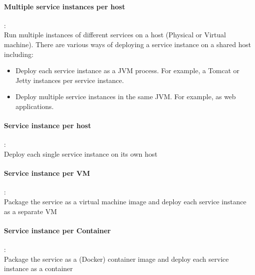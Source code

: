 \paragraph{Multiple service instances per host} :\\
\label{sec:sec01}
Run multiple instances of different services on a host (Physical or Virtual machine).
There are various ways of deploying a service instance on a shared host including:
\begin{itemize}
  \item Deploy each service instance as a JVM process. For example, a Tomcat or Jetty instances per service instance.
  \item Deploy multiple service instances in the same JVM. For example, as web applications.
 \end{itemize}
\paragraph{Service instance per host} :\\
\label{sec:sec01}
Deploy each single service instance on its own host
\paragraph{Service instance per VM} :\\
\label{sec:sec01}
Package the service as a virtual machine image and deploy each service instance as a separate VM
\paragraph{Service instance per Container} :\\
\label{sec:sec01}
Package the service as a (Docker) container image and deploy each service instance as a container
